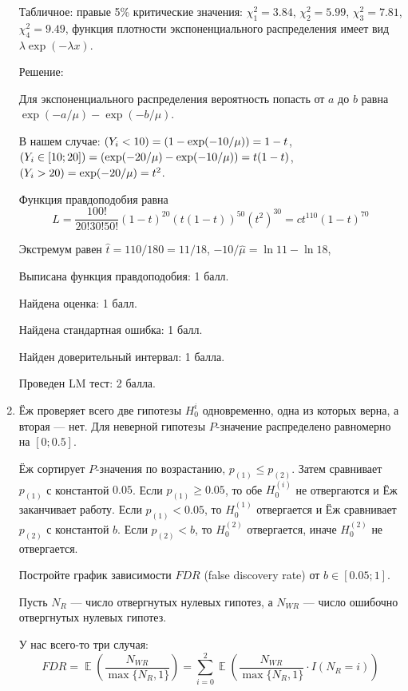 \documentclass[12pt]{article}
\let\P\relax
\DeclareMathOperator{\P}{\mathbb{P}}
\DeclareMathOperator{\E}{\mathbb{E}}
\begin{document}
\begin{enumerate}
Табличное: правые 5\% критические значения: $\chi^2_1 = 3.84$, $\chi^2_2 = 5.99$, $\chi^2_3 = 7.81$, $\chi^2_4=9.49$,
функция плотности экспоненциального распределения имеет вид $\lambda \exp(-\lambda x)$.

Решение:

Для экспоненциального распределения вероятность попасть от $a$ до $b$ равна $\exp(-a/\mu) - \exp(-b/\mu)$.

В нашем случае: $\P(Y_i < 10) = (1 - \exp(-10/\mu)) = 1 - t$, $\P(Y_i \in [10;20]) = (\exp(-20/\mu) - \exp(-10/\mu)) = t(1-t)$,
$\P(Y_i > 20) = \exp(-20/\mu) = t^2$. 

Функция правдоподобия равна
\[
L = \frac{100!}{20!30!50!} (1-t)^{20} (t(1-t))^{50}(t^2)^{30} = c t^{110}(1-t)^{70}
\]

Экстремум равен $\hat t = 110/180=11/18$, $-10/\hat \mu = \ln 11 - \ln 18$, 


Выписана функция правдоподобия: 1 балл.

Найдена оценка: 1 балл.

Найдена стандартная ошибка: 1 балл.

Найден доверительный интервал: 1 балла. 

Проведен LM тест: 2 балла. 


\item Ёж проверяет всего две гипотезы $H_0^i$ одновременно, одна из которых верна, а вторая — нет. 
Для неверной гипотезы $P$-значение распределено равномерно на $[0;0.5]$.

Ёж сортирует $P$-значения по возрастанию, $p_{(1)} \leq p_{(2)}$. Затем сравнивает $p_{(1)}$ с константой $0.05$.
Если $p_{(1)} \geq 0.05$, то обе $H_0^{(i)}$ не отвергаются и Ёж заканчивает работу. 
Если $p_{(1)} < 0.05$, то $H_0^{(1)}$ отвергается и Ёж сравнивает $p_{(2)}$ с константой $b$. 
Если $p_{(2)} < b$, то $H_0^{(2)}$ отвергается, иначе $H_0^{(2)}$ не отвергается.

Постройте график зависимости $FDR$ (false discovery rate) от $b \in [0.05;1]$.

Пусть $N_R$ — число отвергнутых нулевых гипотез, а $N_{WR}$ — число ошибочно отвергнутых нулевых гипотез.


У нас всего-то три случая:
\[
FDR = \E\left(\frac{N_{WR}}{\max\{N_R, 1\}} \right)  =  \sum_{i=0}^2\E\left(\frac{N_{WR}}{\max\{N_R, 1\}} \cdot I(N_{R} = i)\right) 
\]


\end{enumerate}
\end{document}
